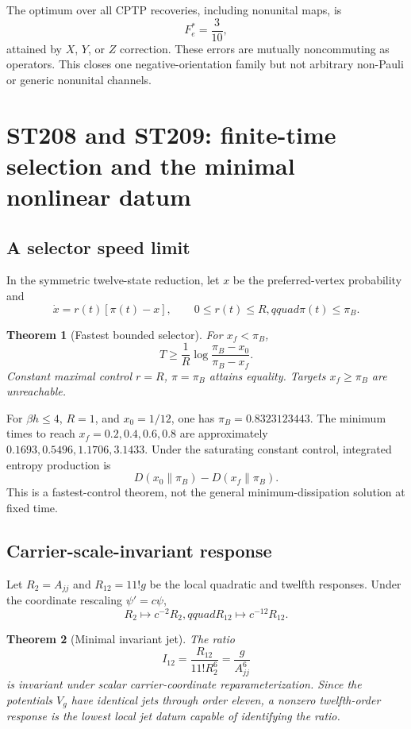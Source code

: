 \documentclass[11pt,a4paper]{article}
\newtheorem{theorem}{Theorem}[section]
\begin{document}
The optimum over all CPTP recoveries, including nonunital maps, is
\[
\boxed{F_e^*=\frac3{10}},
\]
attained by $X$, $Y$, or $Z$ correction. These errors are mutually noncommuting as operators. This closes one negative-orientation family but not arbitrary non-Pauli or generic nonunital channels.

\section{ST208 and ST209: finite-time selection and the minimal nonlinear datum}

\subsection{A selector speed limit}

In the symmetric twelve-state reduction, let $x$ be the preferred-vertex probability and
\[
\dot x=r(t)[\pi(t)-x],\qquad0\le r(t)\le R,qquad \pi(t)\le\pi_B.
\]

\begin{theorem}[Fastest bounded selector]
For $x_f<\pi_B$,
\[
T\ge\frac1R\log\frac{\pi_B-x_0}{\pi_B-x_f}.
\]
Constant maximal control $r=R$, $\pi=\pi_B$ attains equality. Targets $x_f\ge\pi_B$ are unreachable.
\end{theorem}

For $\beta h\le4$, $R=1$, and $x_0=1/12$, one has $\pi_B=0.8323123443$. The minimum times to reach $x_f=0.2,0.4,0.6,0.8$ are approximately $0.1693,0.5496,1.1706,3.1433$. Under the saturating constant control, integrated entropy production is
\[
D(x_0\|\pi_B)-D(x_f\|\pi_B).
\]
This is a fastest-control theorem, not the general minimum-dissipation solution at fixed time.

\subsection{Carrier-scale-invariant response}

Let $R_2=A_{jj}$ and $R_{12}=11!g$ be the local quadratic and twelfth responses. Under the coordinate rescaling $\psi'=c\psi$,
\[
R_2\mapsto c^{-2}R_2,qquad R_{12}\mapsto c^{-12}R_{12}.
\]

\begin{theorem}[Minimal invariant jet]
The ratio
\[
I_{12}=\frac{R_{12}}{11!R_2^6}=\frac{g}{A_{jj}^6}
\]
is invariant under scalar carrier-coordinate reparameterization. Since the potentials $V_g$ have identical jets through order eleven, a nonzero twelfth-order response is the lowest local jet datum capable of identifying the ratio.
\end{theorem}
\end{document}
